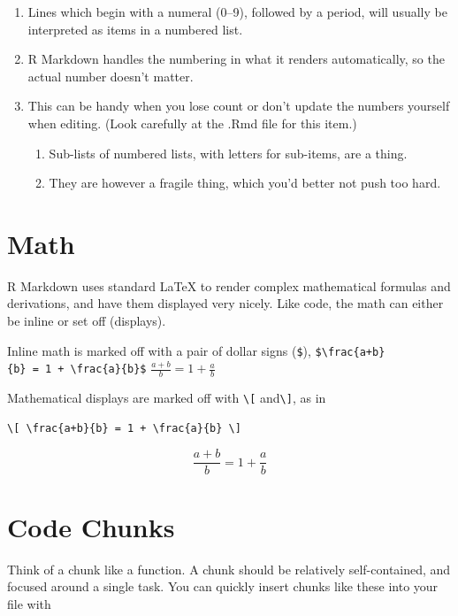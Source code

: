 \documentclass[]{book}
\providecommand{\tightlist}{%
  \setlength{\itemsep}{0pt}\setlength{\parskip}{0pt}}
\begin{document}
\begin{enumerate}
\def\labelenumi{\arabic{enumi}.}
\tightlist
\item
  Lines which begin with a numeral (0--9), followed by a period, will
  usually be interpreted as items in a numbered list.
\item
  R Markdown handles the numbering in what it renders automatically, so
  the actual number doesn't matter.
\item
  This can be handy when you lose count or don't update the numbers
  yourself when editing. (Look carefully at the .Rmd file for this
  item.)

  \begin{enumerate}
  \def\labelenumii{\alph{enumii}.}
  \tightlist
  \item
    Sub-lists of numbered lists, with letters for sub-items, are a
    thing.
  \item
    They are however a fragile thing, which you'd better not push too
    hard.
  \end{enumerate}
\end{enumerate}

\section{Math}\label{math}

R Markdown uses standard LaTeX to render complex mathematical formulas
and derivations, and have them displayed very nicely. Like code, the
math can either be inline or set off (displays).

Inline math is marked off with a pair of dollar signs (\texttt{\$}),
\texttt{\$\textbackslash{}frac\{a+b\}\{b\}\ =\ 1\ +\ \textbackslash{}frac\{a\}\{b\}\$}
\(\frac{a+b}{b} = 1 + \frac{a}{b}\)

Mathematical displays are marked off with \texttt{\textbackslash{}{[}}
and\texttt{\textbackslash{}{]}}, as in

\begin{verbatim}
\[ \frac{a+b}{b} = 1 + \frac{a}{b} \]
\end{verbatim}

\[ \frac{a+b}{b} = 1 + \frac{a}{b} \]

\section{Code Chunks}\label{code-chunks}

Think of a chunk like a function. A chunk should be relatively
self-contained, and focused around a single task. You can quickly insert
chunks like these into your file with
\end{document}
